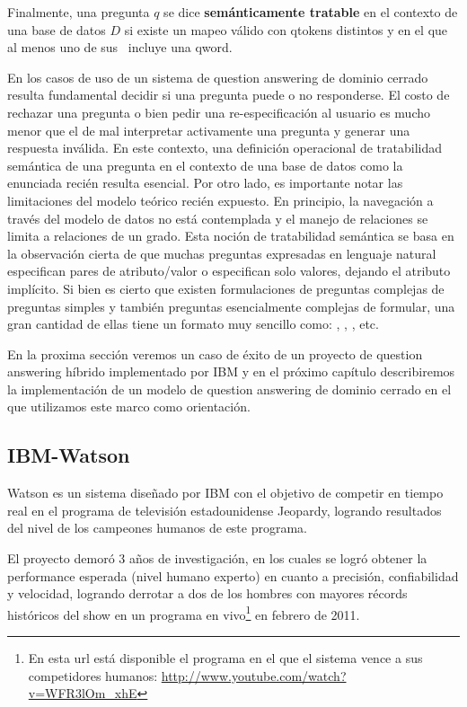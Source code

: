 Finalmente, una pregunta $q$ se dice \textbf{semánticamente tratable} en el contexto de una base de datos $D$ si existe un mapeo válido con qtokens distintos y en el que al menos uno de sus \tradqd\  incluye una qword.

En los casos de uso de un sistema de question answering de dominio cerrado resulta fundamental decidir si una pregunta puede o no responderse. El costo de rechazar una pregunta o bien pedir una re-especificación al usuario es mucho menor que el de mal interpretar activamente una pregunta y generar una respuesta inválida. En este contexto, una definición operacional de tratabilidad semántica de una pregunta en el contexto de una base de datos como la enunciada recién resulta esencial. Por otro lado, es importante notar las limitaciones del modelo teórico recién expuesto. En principio, la navegación a través del modelo de datos no está contemplada y el manejo de relaciones se limita a relaciones de un grado. Esta noción de tratabilidad semántica se basa en la observación cierta de que muchas preguntas expresadas en lenguaje natural especifican pares de atributo/valor o especifican solo valores, dejando el atributo implícito. Si bien es cierto que existen formulaciones de preguntas complejas de preguntas simples y también preguntas esencialmente complejas de formular, una gran cantidad de ellas tiene un formato muy sencillo como:
, , , etc. 

En la proxima sección veremos un caso de éxito de un proyecto de question answering híbrido implementado por IBM y en el próximo capítulo describiremos la implementación de un modelo de question answering de dominio cerrado en el que utilizamos este marco como orientación. 


\subsection{IBM-Watson}
\label{subsec:ibm-watson}
Watson\cite{WATSON1}\cite{WATSON2} es un sistema diseñado por IBM con el objetivo de competir en
tiempo real en el programa de televisión estadounidense Jeopardy,
logrando resultados del nivel de los campeones humanos de este
programa.

El proyecto demoró 3 años de investigación, en los cuales se
logró obtener la performance esperada (nivel humano experto) en
cuanto a precisión, confiabilidad y velocidad, logrando derrotar a
dos de los hombres con mayores récords históricos del show en un
programa en vivo\footnote{En esta url está disponible el programa en el que el sistema vence a sus competidores humanos: \url{http://www.youtube.com/watch?v=WFR3lOm_xhE}} en febrero de 2011.

